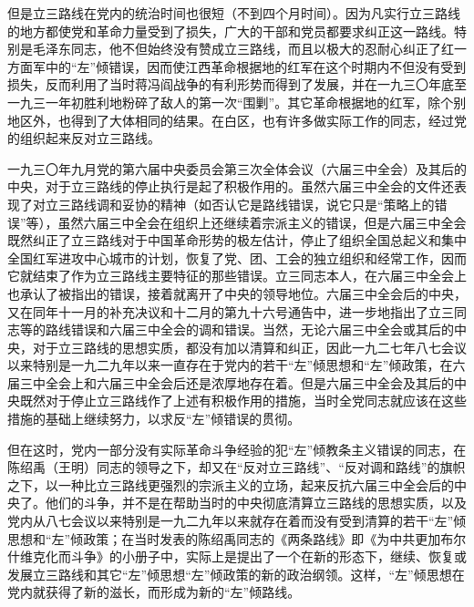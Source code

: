 但是立三路线在党内的统治时间也很短（不到四个月时间）。因为凡实行立三路线的地方都使党和革命力量受到了损失，广大的干部和党员都要求纠正这一路线。特别是毛泽东同志，他不但始终没有赞成立三路线，而且以极大的忍耐心纠正了红一方面军中的“左”倾错误，因而使江西革命根据地的红军在这个时期内不但没有受到损失，反而利用了当时蒋冯阎战争的有利形势而得到了发展，并在一九三〇年底至一九三一年初胜利地粉碎了敌人的第一次“围剿”。其它革命根据地的红军，除个别地区外，也得到了大体相同的结果。在白区，也有许多做实际工作的同志，经过党的组织起来反对立三路线。

一九三〇年九月党的第六届中央委员会第三次全体会议（六届三中全会）及其后的中央，对于立三路线的停止执行是起了积极作用的。虽然六届三中全会的文件还表现了对立三路线调和妥协的精神（如否认它是路线错误，说它只是“策略上的错误”等），虽然六届三中全会在组织上还继续着宗派主义的错误，但是六届三中全会既然纠正了立三路线对于中国革命形势的极左估计，停止了组织全国总起义和集中全国红军进攻中心城市的计划，恢复了党、团、工会的独立组织和经常工作，因而它就结束了作为立三路线主要特征的那些错误。立三同志本人，在六届三中全会上也承认了被指出的错误，接着就离开了中央的领导地位。六届三中全会后的中央，又在同年十一月的补充决议和十二月的第九十六号通告中，进一步地指出了立三同志等的路线错误和六届三中全会的调和错误。当然，无论六届三中全会或其后的中央，对于立三路线的思想实质，都没有加以清算和纠正，因此一九二七年八七会议以来特别是一九二九年以来一直存在于党内的若干“左”倾思想和“左”倾政策，在六届三中全会上和六届三中全会后还是浓厚地存在着。但是六届三中全会及其后的中央既然对于停止立三路线作了上述有积极作用的措施，当时全党同志就应该在这些措施的基础上继续努力，以求反“左”倾错误的贯彻。

但在这时，党内一部分没有实际革命斗争经验的犯“左”倾教条主义错误的同志，在陈绍禹（王明）同志的领导之下，却又在“反对立三路线”、“反对调和路线”的旗帜之下，以一种比立三路线更强烈的宗派主义的立场，起来反抗六届三中全会后的中央了。他们的斗争，并不是在帮助当时的中央彻底清算立三路线的思想实质，以及党内从八七会议以来特别是一九二九年以来就存在着而没有受到清算的若干“左”倾思想和“左”倾政策；在当时发表的陈绍禹同志的《两条路线》即《为中共更加布尔什维克化而斗争》的小册子中，实际上是提出了一个在新的形态下，继续、恢复或发展立三路线和其它“左”倾思想“左”倾政策的新的政治纲领。这样，“左”倾思想在党内就获得了新的滋长，而形成为新的“左”倾路线。


